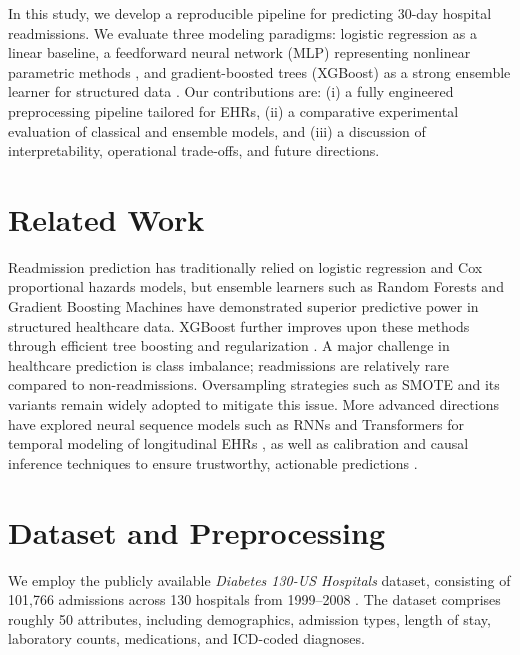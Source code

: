 \documentclass{article}
\begin{document}
In this study, we develop a reproducible pipeline for predicting 30-day hospital readmissions. We evaluate three modeling paradigms: logistic regression as a linear baseline, a feedforward neural network (MLP) representing nonlinear parametric methods \cite{lecun1998gradient}, and gradient-boosted trees (XGBoost) as a strong ensemble learner for structured data \cite{chen2016xgboost}. Our contributions are: (i) a fully engineered preprocessing pipeline tailored for EHRs, (ii) a comparative experimental evaluation of classical and ensemble models, and (iii) a discussion of interpretability, operational trade-offs, and future directions.


\section{Related Work}
Readmission prediction has traditionally relied on logistic regression and Cox proportional hazards models, but ensemble learners such as Random Forests \cite{breiman2001rf} and Gradient Boosting Machines \cite{friedman2001gbm} have demonstrated superior predictive power in structured healthcare data. XGBoost further improves upon these methods through efficient tree boosting and regularization \cite{chen2016xgboost}.  
A major challenge in healthcare prediction is class imbalance; readmissions are relatively rare compared to non-readmissions. Oversampling strategies such as SMOTE \cite{chawla2002smote} and its variants \cite{he2008adasyn} remain widely adopted to mitigate this issue. More advanced directions have explored neural sequence models such as RNNs and Transformers for temporal modeling of longitudinal EHRs \cite{choi2016doctor,vaswani2017attention}, as well as calibration and causal inference techniques to ensure trustworthy, actionable predictions \cite{zadrozny2001calibration,pearl2009causality}.


\section{Dataset and Preprocessing}
We employ the publicly available \emph{Diabetes 130-US Hospitals} dataset, consisting of 101,766 admissions across 130 hospitals from 1999–2008 \cite{diabetes_130-us_hospitals_for_years_1999-2008_296}. The dataset comprises roughly 50 attributes, including demographics, admission types, length of stay, laboratory counts, medications, and ICD-coded diagnoses.
\end{document}
